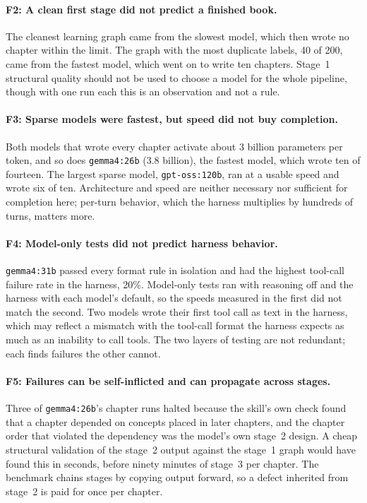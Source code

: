 \documentclass[11pt]{article}
\newcommand{\mdl}[1]{\texttt{#1}}
\newcommand{\Gthirtyone}{\mdl{gemma4:31b}}
\newcommand{\Gtwentysix}{\mdl{gemma4:26b}}
\newcommand{\Gptoss}{\mdl{gpt-oss:120b}}
\begin{document}
\paragraph{F2: A clean first stage did not predict a finished book.}
The cleanest learning graph came from the slowest model, which then wrote no chapter within the limit. The graph with the most duplicate labels, 40 of 200, came from the fastest model, which went on to write ten chapters. Stage~1 structural quality should not be used to choose a model for the whole pipeline, though with one run each this is an observation and not a rule.

\paragraph{F3: Sparse models were fastest, but speed did not buy completion.}
Both models that wrote every chapter activate about 3 billion parameters per token, and so does \Gtwentysix{} (3.8 billion), the fastest model, which wrote ten of fourteen. The largest sparse model, \Gptoss, ran at a usable speed and wrote six of ten. Architecture and speed are neither necessary nor sufficient for completion here; per-turn behavior, which the harness multiplies by hundreds of turns, matters more.

\paragraph{F4: Model-only tests did not predict harness behavior.}
\Gthirtyone{} passed every format rule in isolation and had the highest tool-call failure rate in the harness, 20\%. Model-only tests ran with reasoning off and the harness with each model's default, so the speeds measured in the first did not match the second. Two models wrote their first tool call as text in the harness, which may reflect a mismatch with the tool-call format the harness expects as much as an inability to call tools. The two layers of testing are not redundant; each finds failures the other cannot.

\paragraph{F5: Failures can be self-inflicted and can propagate across stages.}
Three of \Gtwentysix's chapter runs halted because the skill's own check found that a chapter depended on concepts placed in later chapters, and the chapter order that violated the dependency was the model's own stage~2 design. A cheap structural validation of the stage~2 output against the stage~1 graph would have found this in seconds, before ninety minutes of stage~3 per chapter. The benchmark chains stages by copying output forward, so a defect inherited from stage~2 is paid for once per chapter.
\end{document}
